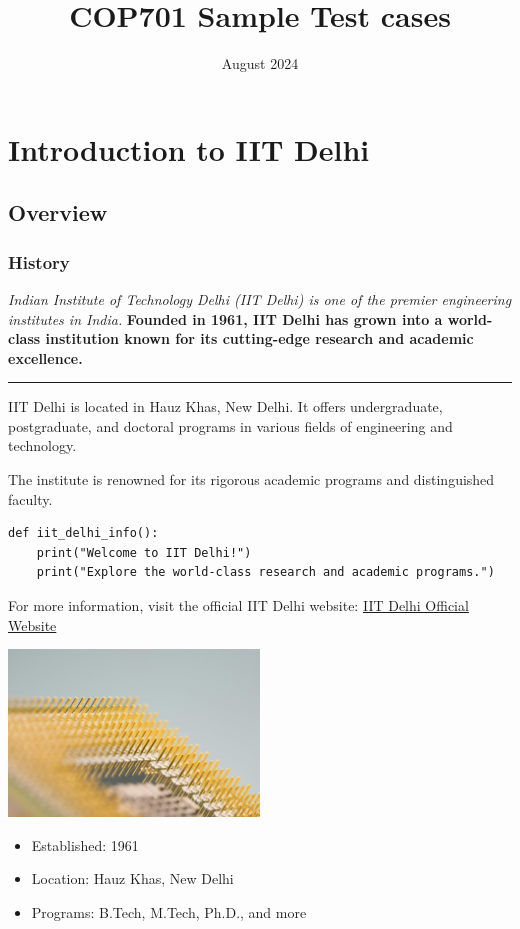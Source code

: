 \documentclass{article}
\title{COP701 Sample Test cases}
\date{August 2024}
\begin{document}
\section{Introduction to IIT Delhi}
\subsection{Overview}
\subsubsection{History}

\textit{Indian Institute of Technology Delhi (IIT Delhi) is one of the premier engineering institutes in India.}
\textbf{Founded in 1961, IIT Delhi has grown into a world-class institution known for its cutting-edge research and academic excellence.}

\hrule

IIT Delhi is located in Hauz Khas, New Delhi. It offers undergraduate, postgraduate, and doctoral programs in various fields of engineering and technology.\par
The institute is renowned for its rigorous academic programs and distinguished faculty.

\begin{verbatim}
def iit_delhi_info():
    print("Welcome to IIT Delhi!")
    print("Explore the world-class research and academic programs.")
\end{verbatim}

For more information, visit the official IIT Delhi website: \href{https://www.iitd.ac.in}{IIT Delhi Official Website}

\includegraphics[width=0.5\textwidth]{images/technology.jpg}

\begin{itemize}
    \item Established: 1961
    \item Location: Hauz Khas, New Delhi
    \item Programs: B.Tech, M.Tech, Ph.D., and more
\end{itemize}
\end{document}
